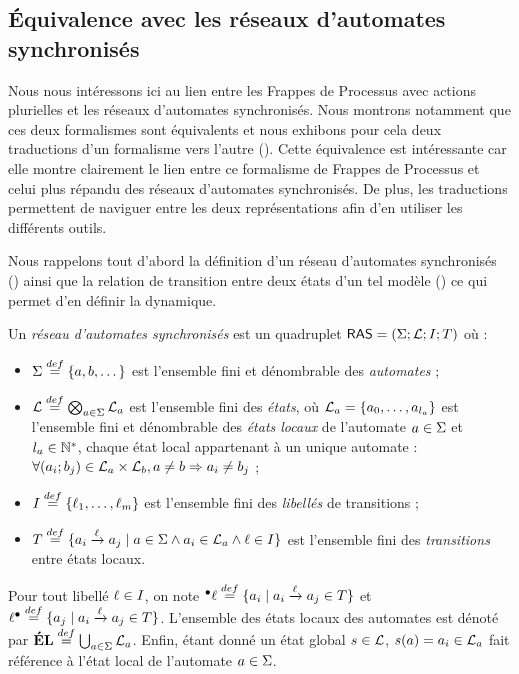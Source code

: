 \subsection{Équivalence avec les réseaux d'automates synchronisés}


Nous nous intéressons ici au lien entre les Frappes de Processus avec actions plurielles
et les réseaux d'automates synchronisés.
Nous montrons notamment que ces deux formalismes sont équivalents
et nous exhibons pour cela deux traductions d'un formalisme vers l'autre
().
Cette équivalence est intéressante car elle montre clairement le lien entre ce formalisme
de Frappes de Processus et celui plus répandu des réseaux d'automates synchronisés.
De plus, les traductions permettent de naviguer entre les deux représentations
afin d'en utiliser les différents outils.

Nous rappelons tout d'abord la définition d'un réseau d'automates synchronisés ()
ainsi que la relation de transition entre deux états d'un tel modèle ()
ce qui permet d'en définir la dynamique.

\begin{definition}
  Un \emph{réseau d'automates synchronisés} est un quadruplet $\mathsf{RAS} = (\Sigma; \mathcal{L}; I; T)$
  où :
  \begin{itemize}
    \item $\Sigma \stackrel{def}= \{a, b, \dots\}$ est l'ensemble fini et dénombrable des \emph{automates} ;
    \item $\mathcal{L} \stackrel{def}= \bigotimes_{a \in \Sigma} \mathcal{L}_a$ est l'ensemble fini des \emph{états},
      où $\mathcal{L}_a = \{a_0, \ldots, a_{l_a}\}$ est l'ensemble fini et dénombrable
      des \emph{états locaux} de l'automate $a \in \Sigma$ et $l_a \in \mathbb{N}^*$,
      chaque état local appartenant à un unique automate :
      $\forall (a_i; b_j) \in \mathcal{L}_a \times \mathcal{L}_b, a \neq b \Rightarrow a_i \neq b_j$ ;
    \item $I \stackrel{def}= \{\ell_1, \dots, \ell_m\}$ est l'ensemble fini des
      \emph{libellés} de transitions ;
    \item $T \stackrel{def}= \{ a_i \xrightarrow{\ell} a_j \mid a \in \Sigma \wedge a_i \in \mathcal{L}_a \wedge
      \ell \in I \}$ est l'ensemble fini des \emph{transitions} entre états locaux.
  \end{itemize}
  Pour tout libellé $\ell \in I$, on note
  ${}^\bullet \ell \stackrel{def}= \{ a_i \mid a_i \xrightarrow{\ell} a_j \in T \}$
  et $\ell {}^\bullet \stackrel{def}= \{ a_j \mid a_i \xrightarrow{\ell} a_j \in T \}$.
  L'ensemble des états locaux des automates est dénoté par
  $\mathbf{\acute{E}L} \stackrel{def}= \bigcup_{a \in \Sigma} \mathcal{L}_a$.
  Enfin, étant donné un état global $s \in \mathcal{L}$, $s(a) = a_i \in \mathcal{L}_a$
  fait référence à l'état local de l'automate $a \in \Sigma$.
\end{definition}

